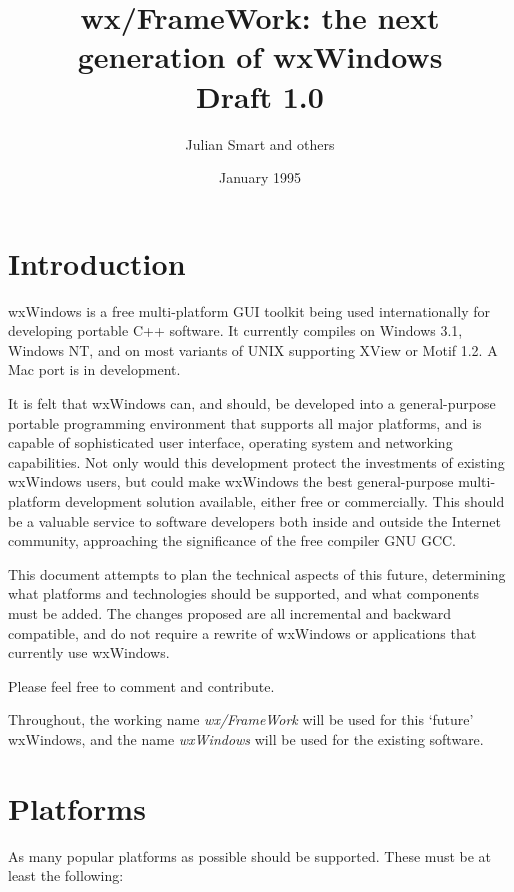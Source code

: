 
\title{wx/FrameWork: the next generation of wxWindows\\Draft 1.0}
\author{Julian Smart and others}
\date{January 1995}
\parskip 12pt
\parindent 0pt

\maketitle
\tableofcontents

\chapter{Introduction}

wxWindows is a free multi-platform GUI toolkit being used
internationally for developing portable C++ software. It currently
compiles on Windows 3.1, Windows NT, and on most variants of UNIX
supporting XView or Motif 1.2. A Mac port is in development.

It is felt that wxWindows can, and should, be developed into a
general-purpose portable programming environment that supports all major
platforms, and is capable of sophisticated user interface, operating
system and networking capabilities. Not only would this development
protect the investments of existing wxWindows users, but could make
wxWindows the best general-purpose multi-platform development solution
available, either free or commercially. This should be a valuable
service to software developers both inside and outside the Internet
community, approaching the significance of the free compiler GNU GCC.

This document attempts to plan the technical aspects of this future,
determining what platforms and technologies should be supported, and
what components must be added. The changes proposed are all incremental
and backward compatible, and do not require a rewrite of wxWindows or
applications that currently use wxWindows.

Please feel free to comment and contribute.

Throughout, the working name {\it wx/FrameWork} will be used for this `future'
wxWindows, and the name {\it wxWindows} will be used for the existing
software.

\chapter{Platforms}

As many popular platforms as possible should be supported. These must be
at least the following:


